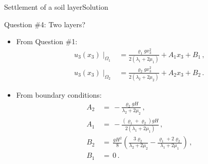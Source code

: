 \documentclass{beamer}
\newcommand{\uj}{u}
\newcommand{\xj}{x}
\newcommand{\medium}{\Omega}
\newcommand{\roi}{\varrho}
\begin{document}
\begin{frame}{Settlement of a soil layer}{Solution}
\begin{overprint}
\vskip-20pt
\begin{exampleblock}{Question \#4: Two layers?}
\begin{itemize}
\item From Question \#1:
\begin{displaymath}
\begin{split}
\scriptstyle \uj_3(\xj_3)\mid_{\medium_1} & \scriptstyle =\frac{\roi_1 g\xj_3^2}{2(\lambda_1+2\mu_1)}+A_1\xj_3+B_1 \,, \\
\scriptstyle \uj_3(\xj_3)\mid_{\medium_2} & \scriptstyle =\frac{\roi_2 g\xj_3^2}{2(\lambda_2+2\mu_2)}+A_2\xj_3+B_2 \,.
\end{split}
\end{displaymath}
\item From boundary conditions:
\begin{displaymath}
\begin{split}
\scriptstyle A_2 \, & \scriptstyle = \, -\frac{\roi_2 gH}{\lambda_2+2\mu_2} \,, \\
\scriptstyle A_1 \, & \scriptstyle = \, -\frac{(\roi_1+\roi_2) gH}{2(\lambda_1+2\mu_1)}  \,, \\
\scriptstyle B_2 \, & \scriptstyle = \, \frac{gH^2}{8}\left(\frac{3\roi_2}{\lambda_2+2\mu_2}-\frac{\roi_1+2\roi_2}{\lambda_1+2\mu_1}\right) \,, \\
\scriptstyle B_1 \, & \scriptstyle = \, 0 \,.
\end{split}
\end{displaymath}
\end{itemize}
\end{exampleblock}

\end{overprint}

\end{frame}
\end{document}
